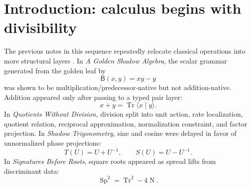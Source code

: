 \documentclass[11pt]{article}
\newcommand{\B}{\mathsf{B}}
\newcommand{\Tr}{\operatorname{Tr}}
\newcommand{\Nm}{\operatorname{N}}
\newcommand{\Sp}{\operatorname{Sp}}
\newcommand{\sig}{\sigma}
\newcommand{\ph}{\varphi}
\newcommand{\Z}{\mathbb{Z}}
\newcommand{\dd}{\partial_{\ph}}
\newcommand{\ord}{\operatorname{ord}}
\begin{document}
\begin{abstract}
This bounded-weight phenomenon has a direct analytic consequence: the untwisted eigen-equation $\dd E=E$ gives a reciprocal-product exponential with radius of convergence exactly $\ph^2=\ph+1$, hence a non-entire function.  By contrast, the twist-compatible equation $\dd\mathcal E=\sig_{\ph}(\mathcal E)$ gives a product exponential whose finite approximants are denominator-free polynomials in $\Z[\ph][x]$ and whose completed product is entire.  These are the two standard $q$-exponentials at $q=\ph^{-1}$; the contribution here is their placement in the $\ph$-native hierarchy.  The untwisted exponential lives in the localization layer, while the twisted exponential lives first in the polynomial/completion layer.  The same orbit viewpoint explains the logarithmic boundary: on the golden unit group, logarithm is the exact integer index $\ord_{\ph}(\ph^k)=k$; off the group, scalar analytic logarithm is an interpolation of that index, with denominators recording the cost of leaving the discrete orbit.  The product exponential has zeros at $-\ph^{2+k}$, the reciprocal exponential has poles at $+\ph^{2+k}$, and the nearest orbit obstruction explains the common radius $\ph^2$.  The integration layer has a parallel arithmetic obstruction: among the weights $[n]_{\ph}$, only $[1]_{\ph}$ and $[2]_{\ph}$ are units in $\Z[\ph]$.
\end{abstract}

\tableofcontents

\section{Introduction: calculus begins with divisibility}

The previous notes in this sequence repeatedly relocate classical operations into more structural layers \cite{santosGoldenShadow,santosQuotients,santosShadowTrig,santosSignatures}.  In \emph{A Golden Shadow Algebra}, the scalar grammar generated from the golden leaf by
\[
    \B(x,y)=xy-y
\]
was shown to be multiplication/predecessor-native but not addition-native.  Addition appeared only after passing to a typed pair layer:
\[
    x+y=\Tr\langle x\mid y\rangle.
\]
In \emph{Quotients Without Division}, division split into unit action, rate localization, quotient relation, reciprocal approximation, normalization constraint, and factor projection.  In \emph{Shadow Trigonometry}, sine and cosine were delayed in favor of unnormalized phase projections:
\[
    T(U)=U+U^{-1},
    \qquad
    S(U)=U-U^{-1}.
\]
In \emph{Signatures Before Roots}, square roots appeared as spread lifts from discriminant data:
\[
    \Sp^2=\Tr^2-4\Nm.
\]
\end{document}
